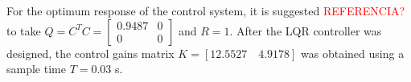 For the optimum response of the control system, it is suggested \textcolor{red}{REFERENCIA?} to take $Q = C^{T}C = \begin{bmatrix}
0.9487 & 0\\
0 & 0
\end{bmatrix}$ and $R = 1 $. 
After the LQR controller was designed, the control gains matrix $K = [12.5527 \quad 4.9178]$ was obtained using a sample time $T = 0.03$ s.











